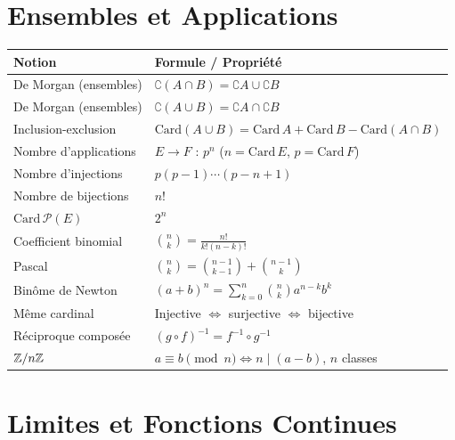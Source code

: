 \section{Ensembles et Applications}

\begin{center}
\renewcommand{\arraystretch}{1.4}
\begin{tabular}{|l|l|}
\hline
\textbf{Notion} & \textbf{Formule / Propriété} \\
\hline
De Morgan (ensembles) & $\complement(A \cap B) = \complement A \cup \complement B$ \\
De Morgan (ensembles) & $\complement(A \cup B) = \complement A \cap \complement B$ \\
Inclusion-exclusion & $\mathrm{Card}(A \cup B) = \mathrm{Card}\, A + \mathrm{Card}\, B - \mathrm{Card}(A \cap B)$ \\
Nombre d'applications & $E \to F$ : $p^n$ \; ($n = \mathrm{Card}\, E$, $p = \mathrm{Card}\, F$) \\
Nombre d'injections & $p(p-1)\cdots(p-n+1)$ \\
Nombre de bijections & $n!$ \\
$\mathrm{Card}\, \mathcal{P}(E)$ & $2^n$ \\
Coefficient binomial & $\binom{n}{k} = \frac{n!}{k!(n-k)!}$ \\
Pascal & $\binom{n}{k} = \binom{n-1}{k-1} + \binom{n-1}{k}$ \\
Binôme de Newton & $(a+b)^n = \sum_{k=0}^{n} \binom{n}{k} a^{n-k} b^k$ \\
Même cardinal & Injective $\iff$ surjective $\iff$ bijective \\
Réciproque composée & $(g \circ f)^{-1} = f^{-1} \circ g^{-1}$ \\
$\mathbb{Z}/n\mathbb{Z}$ & $a \equiv b \pmod{n} \iff n \mid (a-b)$, \; $n$ classes \\
\hline
\end{tabular}
\end{center}

\section{Limites et Fonctions Continues}

